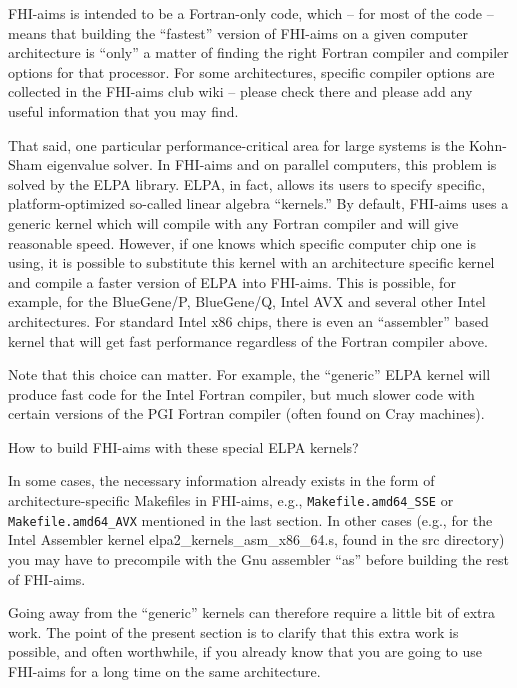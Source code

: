 FHI-aims is intended to be a Fortran-only code, which -- for most of
the code -- means that building the ``fastest'' version of FHI-aims on
a given computer architecture is ``only'' a matter of finding the
right Fortran compiler and compiler options for that processor. For
some architectures, specific compiler options are collected in the
FHI-aims club wiki -- please check there and please add any useful
information that you may find.

That said, one particular performance-critical area for large systems
is the Kohn-Sham eigenvalue solver. In FHI-aims and on parallel
computers, this problem is solved by the ELPA library. ELPA, in fact,
allows its users to specify specific, platform-optimized so-called
linear algebra ``kernels.'' By default, FHI-aims uses a generic kernel
which will compile with any Fortran compiler and will give reasonable
speed. However, if one knows which specific computer chip one is
using, it is possible to substitute this kernel with an architecture
specific kernel and compile a faster version of ELPA into
FHI-aims. This is possible, for example, for the BlueGene/P,
BlueGene/Q, Intel AVX and several other Intel architectures. For
standard Intel x86 chips, there is even an ``assembler'' based kernel
that will get fast performance regardless of the Fortran compiler
above.

Note that this choice can matter. For example, the ``generic'' ELPA
kernel will produce fast code for the Intel Fortran compiler, but much
slower code with certain versions of the PGI Fortran compiler (often
found on Cray machines).

How to build FHI-aims with these special ELPA kernels?

In some cases, the necessary information already exists in the form of
architecture-specific Makefiles in FHI-aims, e.g.,
\texttt{Makefile.amd64\_SSE} or \texttt{Makefile.amd64\_AVX} mentioned
in the last section. In other cases (e.g., for the Intel Assembler
kernel elpa2\_kernels\_asm\_x86\_64.s, found in the src directory) you may
have to precompile with the Gnu assembler ``as'' before building the
rest of FHI-aims.

Going away from the ``generic'' kernels can therefore require a little
bit of extra work. The point of the present section is to clarify that
this extra work is possible, and often worthwhile, if you already know
that you are going to use FHI-aims for a long time on the same
architecture. 
